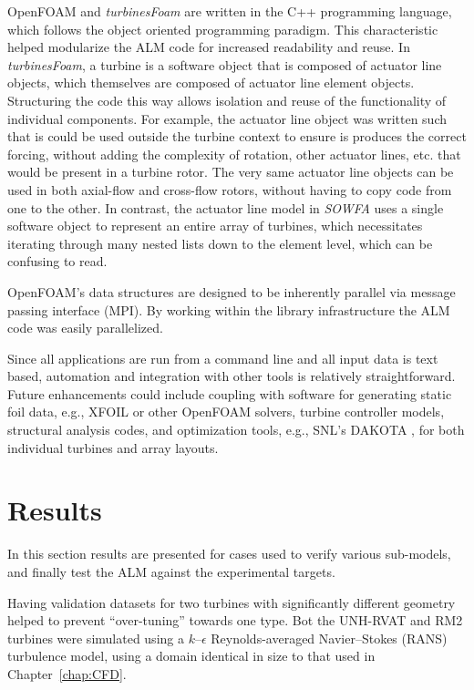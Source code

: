 OpenFOAM and \textit{turbinesFoam} are written in the C++ programming language,
which follows the object oriented programming paradigm. This characteristic
helped modularize the ALM code for increased readability and reuse. In
\textit{turbinesFoam}, a turbine is a software object that is composed of
actuator line objects, which themselves are composed of actuator line element
objects. Structuring the code this way allows isolation and reuse of the
functionality of individual components. For example, the actuator line object
was written such that is could be used outside the turbine context to ensure is
produces the correct forcing, without adding the complexity of rotation, other
actuator lines, etc. that would be present in a turbine rotor. The very same
actuator line objects can be used in both axial-flow and cross-flow rotors,
without having to copy code from one to the other. In contrast, the actuator
line model in \textit{SOWFA} uses a single software object to represent an
entire array of turbines, which necessitates iterating through many nested lists
down to the element level, which can be confusing to read.

OpenFOAM's data structures are designed to be inherently parallel via message
passing interface (MPI). By working within the library infrastructure the ALM
code was easily parallelized.

Since all applications are run from a command line and all input data is text
based, automation and integration with other tools is relatively
straightforward. Future enhancements could include coupling with software for
generating static foil data, e.g., XFOIL or other OpenFOAM solvers, turbine
controller models, structural analysis codes, and optimization tools, e.g.,
SNL's DAKOTA , for both individual
turbines and array layouts.


\section{Results}

In this section results are presented for cases used to verify various
sub-models, and finally test the ALM against the experimental targets.


Having validation datasets for two turbines with significantly different
geometry helped to prevent ``over-tuning'' towards one type. Bot the UNH-RVAT
and RM2 turbines were simulated using a $k$--$\epsilon$ Reynolds-averaged
Navier--Stokes (RANS) turbulence model, using a domain identical in size to that
used in Chapter~\ref{chap:CFD}.

